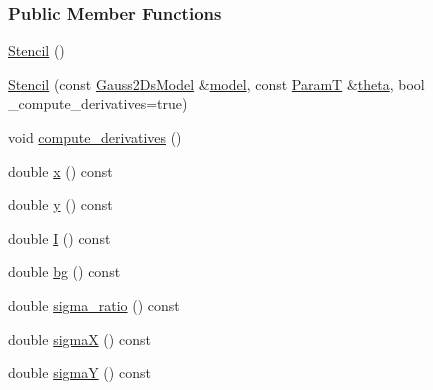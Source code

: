 \subsubsection*{Public Member Functions}
\begin{DoxyCompactItemize}
\item 
\hyperlink{classmappel_1_1Gauss2DsModel_1_1Stencil_a5da67675e94a28486035ff4168e56232}{Stencil} ()
\item 
\hyperlink{classmappel_1_1Gauss2DsModel_1_1Stencil_a924f5f8d4524831f1ef50041b85a842f}{Stencil} (const \hyperlink{classmappel_1_1Gauss2DsModel}{Gauss2\+Ds\+Model} \&\hyperlink{classmappel_1_1Gauss2DsModel_1_1Stencil_a72343963916c0c5eac103d034a6b954b}{model}, const \hyperlink{classmappel_1_1Gauss2DsModel_1_1Stencil_ab23d0622d37f67fb3079dcd7dad848fa}{ParamT} \&\hyperlink{classmappel_1_1Gauss2DsModel_1_1Stencil_af3639dad603ce4b9ed94bfcd25f95cab}{theta}, bool \+\_\+compute\+\_\+derivatives=true)
\item 
void \hyperlink{classmappel_1_1Gauss2DsModel_1_1Stencil_ab11c806f8335bbafeb3db7476526680d}{compute\+\_\+derivatives} ()
\item 
double \hyperlink{classmappel_1_1Gauss2DsModel_1_1Stencil_a1016a9626a43cf16f31cc12bbbe436ff}{x} () const 
\item 
double \hyperlink{classmappel_1_1Gauss2DsModel_1_1Stencil_a87714b5ee5130031f0e626750ba8b5dc}{y} () const 
\item 
double \hyperlink{classmappel_1_1Gauss2DsModel_1_1Stencil_ac3c9d93e5830a73edf06e203c6beabb9}{I} () const 
\item 
double \hyperlink{classmappel_1_1Gauss2DsModel_1_1Stencil_a2324f8759376c5ead66ab1fb64e72e55}{bg} () const 
\item 
double \hyperlink{classmappel_1_1Gauss2DsModel_1_1Stencil_a98f618270de5ff947a1ed9800dffd977}{sigma\+\_\+ratio} () const 
\item 
double \hyperlink{classmappel_1_1Gauss2DsModel_1_1Stencil_adab71d870d1b32f78e85d273dd7bd006}{sigmaX} () const 
\item 
double \hyperlink{classmappel_1_1Gauss2DsModel_1_1Stencil_abc29f317d508c398a3fcc337a1fb8d1f}{sigmaY} () const 
\end{DoxyCompactItemize}

